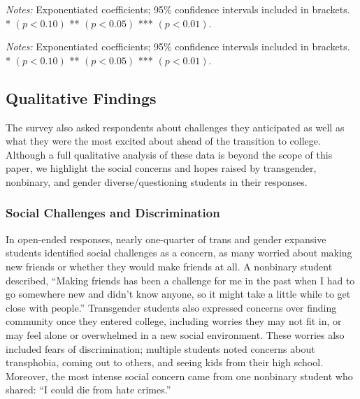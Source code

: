 \begin{table}[htbp]
\centering
\caption{Ordered Logit Models: Highest Degree Plans by Gender Identity (Odds Ratios)}
\label{tab:olm_degree_gender}

\medskip 
\begin{minipage}{\linewidth}
\noindent\footnotesize\textit{Notes:} Exponentiated coefficients; 95\% confidence intervals included in
brackets. \\  * $(p<0.10)$ ** $(p<0.05)$ *** $(p<0.01)$.
\end{minipage}
\end{table}

\begin{table}[htbp]
\centering
\caption{Ordered Logit Models: Highest Degree Plans by Sexual Orientation (Odds Ratios)}
\label{tab:olm_degree_so}

\medskip 
\begin{minipage}{\linewidth}
\noindent\footnotesize\textit{Notes:} Exponentiated coefficients; 95\% confidence intervals included in
brackets. \\  * $(p<0.10)$ ** $(p<0.05)$ *** $(p<0.01)$.
\end{minipage}
\end{table}

\subsection{Qualitative Findings}\label{qualitative-findings}

The survey also asked respondents about challenges they anticipated as
well as what they were the most excited about ahead of the transition to
college. Although a full qualitative analysis of these data is beyond
the scope of this paper, we highlight the social concerns and hopes
raised by transgender, nonbinary, and gender diverse/questioning
students in their responses.

\subsubsection{Social Challenges and Discrimination}\label{social-challenges-and-discrimination}

In open-ended responses, nearly one-quarter of trans and gender
expansive students identified social challenges as a concern, as many
worried about making new friends or whether they would make friends at
all. A nonbinary student described, ``Making friends has been a challenge
for me in the past when I had to go somewhere new and didn't know
anyone, so it might take a little while to get close with people.''
Transgender students also expressed concerns over finding community once
they entered college, including worries they may not fit in, or may feel
alone or overwhelmed in a new social environment. These worries also
included fears of discrimination; multiple students noted concerns about
transphobia, coming out to others, and seeing kids from their high
school. Moreover, the most intense social concern came from one
nonbinary student who shared: ``I could die from hate crimes.''

